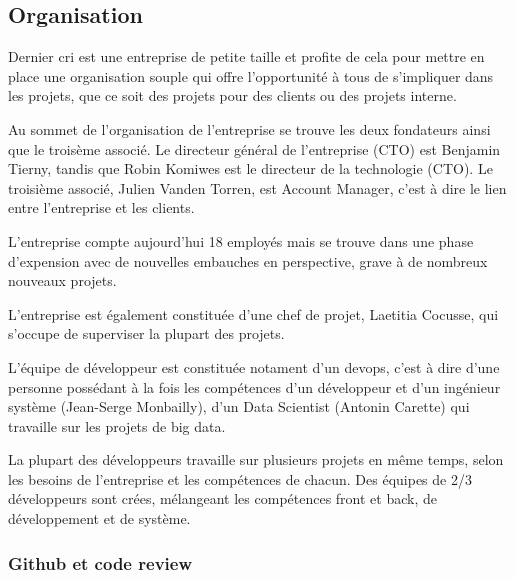 \bigskip

\subsection{Organisation}\label{organisation}

\bigskip

Dernier cri est une entreprise de petite taille et profite de cela pour
mettre en place une organisation souple qui offre l'opportunité à tous
de s'impliquer dans les projets, que ce soit des projets pour des
clients ou des projets interne.

\bigskip

Au sommet de l'organisation de l'entreprise se trouve les deux
fondateurs ainsi que le troisème associé. Le directeur général de
l'entreprise (CTO) est Benjamin Tierny, tandis que Robin Komiwes est le
directeur de la technologie (CTO). Le troisième associé, Julien Vanden
Torren, est Account Manager, c'est à dire le lien entre l'entreprise et
les clients.

\bigskip

L'entreprise compte aujourd'hui 18 employés mais se trouve dans une
phase d'expension avec de nouvelles embauches en perspective, grave à de
nombreux nouveaux projets.

\bigskip

L'entreprise est également constituée d'une chef de projet, Laetitia
Cocusse, qui s'occupe de superviser la plupart des projets.

\bigskip

L'équipe de développeur est constituée notament d'un devops, c'est à
dire d'une personne possédant à la fois les compétences d'un développeur
et d'un ingénieur système (Jean-Serge Monbailly), d'un Data Scientist
(Antonin Carette) qui travaille sur les projets de big data.

\bigskip

La plupart des développeurs travaille sur plusieurs projets en même
temps, selon les besoins de l'entreprise et les compétences de chacun.
Des équipes de 2/3 développeurs sont crées, mélangeant les compétences
front et back, de développement et de système.

\bigskip

\subsubsection{Github et code review}\label{github-et-code-review}

\bigskip

